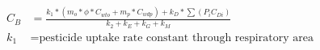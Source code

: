 \documentclass[varwidth=true, border=2pt, convert -shell -escape -density=400]{standalone}
\begin{document}
\begin{align*}
C_{B} & = \frac{k_{1} * (m_{o}*\phi*C_{wto} +m_{p}*C_{wdp})+k_{D}*\sum(P_{i}C_{Di})}{k_{2}+k_{E}+k_{G}+k_{M}} \nonumber \\
k_{1} & =  \text{pesticide uptake rate constant through respiratory area} \nonumber \\
\end{align*} 
\end{document}
